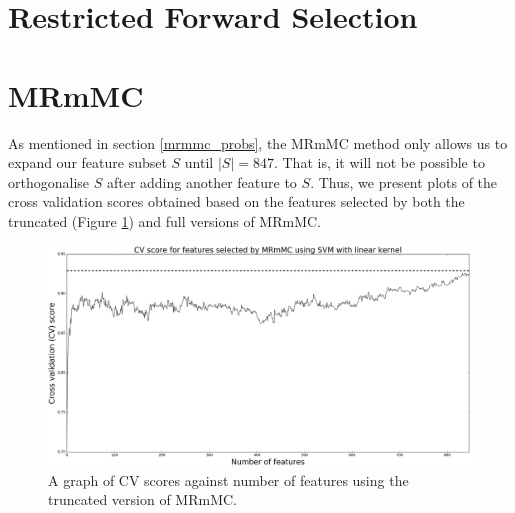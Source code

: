 \documentclass[12pt, twoside, a4paper]{report}
\begin{document}

\section{Restricted Forward Selection}

\section{MRmMC}

As mentioned in section \ref{mrmmc_probs}, the MRmMC method only allows us to expand our feature subset $S$ until $|S|=847$. That is, it will not be possible to orthogonalise $S$ after adding another feature to $S$. Thus, we present plots of the cross validation scores obtained based on the features selected by both the truncated (Figure \ref{body:mrmmc_trun}) and full versions of MRmMC.

\begin{figure}
\centering
\includegraphics[width=\textwidth]{images/mrmmc_linear_847.jpeg}
\caption{A graph of CV scores against number of features using the truncated version of MRmMC.}
\label{body:mrmmc_trun}
\end{figure}
\end{document}
